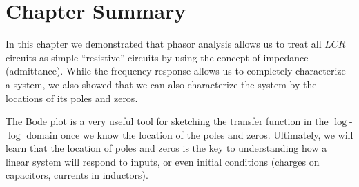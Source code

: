 \section{Chapter Summary}
In this chapter we demonstrated that phasor analysis allows us to treat all $LCR$ circuits as simple “resistive” circuits by using the concept of impedance (admittance).  While the frequency response allows us to completely characterize a system, we also showed that we can also characterize the system by the locations of its poles and zeros.

The Bode plot is a very useful tool for sketching the transfer function in the $\log$-$\log$ domain once we know the location of the poles and zeros.  Ultimately, we will learn that the location of poles and zeros is the key to understanding how a linear system will respond to inputs, or even initial conditions (charges on capacitors, currents in inductors).
